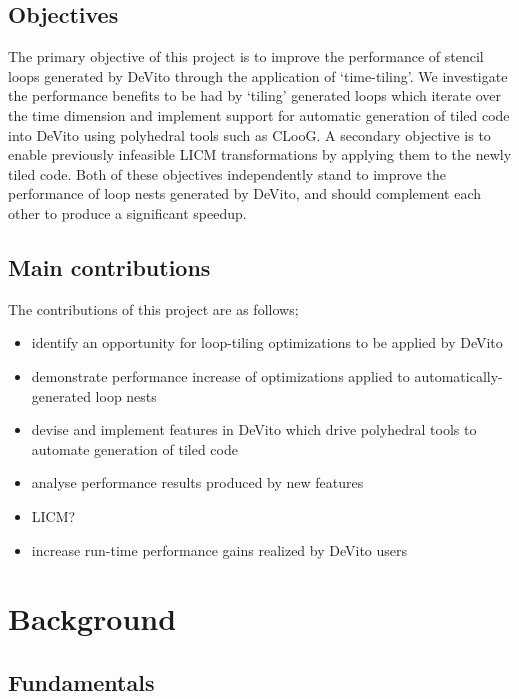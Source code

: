 \documentclass[a4paper,12pt,twoside]{report}
\begin{document}
\section{Objectives}
The primary objective of this project is to improve the performance of stencil loops generated by DeVito through the application of 
`time-tiling'. We investigate the performance benefits to be had by `tiling' generated loops which iterate over the time dimension
and implement support for automatic generation of tiled code into DeVito using polyhedral tools such as CLooG. A secondary objective
is to enable previously infeasible LICM transformations by applying them to the newly tiled code. Both of these objectives independently
stand to improve the performance of loop nests generated by DeVito, and should complement each other to produce a significant speedup.

\section{Main contributions}
The contributions of this project are as follows;
\begin{itemize}
	\item{identify an opportunity for loop-tiling optimizations to be applied by DeVito}
	\item{demonstrate performance increase of optimizations applied to automatically-generated loop nests}
	\item{devise and implement features in DeVito which drive polyhedral tools to automate generation of tiled code}
	\item{analyse performance results produced by new features}
	\item{LICM?}
	\item{increase run-time performance gains realized by DeVito users}
\end{itemize}

\chapter{Background}

\section{Fundamentals}
\end{document}
